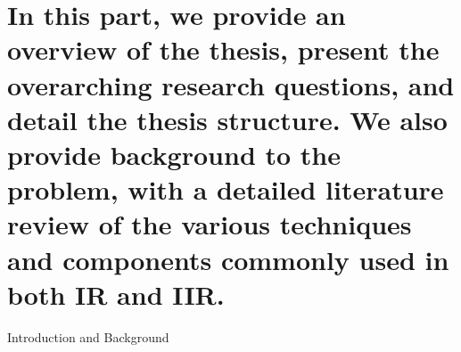 
\part[Introduction and Background]{In this part, we provide an overview of the thesis, present the overarching research questions, and detail the thesis structure. We also provide background to the problem, with a detailed literature review of the various techniques and components commonly used in both IR and IIR.}{Introduction and Background}
\label{part:intro}